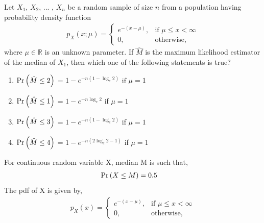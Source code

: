 \documentclass[]{article}
\theoremstyle{remark}
\begin{document}
\providecommand{\qfunc}[1]{\ensuremath{Q\left(#1\right)}}
\providecommand{\gauss}[2]{\mathcal{N}\ensuremath{\left(#1,#2\right)}}
\providecommand{\diff}[2]{\ensuremath{\frac{d{#1}}{d{#2}}}}
\providecommand{\myceil}[1]{\left \lceil #1 \right \rceil }
\newcommand\figref{Fig.~\ref}
\newcommand\tabref{Table~\ref}
\newcommand{\sinc}{\,\text{sinc}\,}
\newcommand{\rect}{\,\text{rect}\,}

\let\vec\mathbf

Let $X_1$, $X_2$, ... , $X_n$ be a random sample of size $n$ from a population having probability density function
\begin{align}
p_X(x; \mu) =
\begin{cases}
e^{-(x-\mu)}, & \text{if } \mu \leq x < \infty \\
0, & \text{otherwise,} 
\end{cases}
\end{align}
where $\mu \in \mathbb{R}$ is an unknown parameter. If $\hat{M}$ is the maximum likelihood estimator of the median of $X_1$, then which one of the following statements is true?
\begin{enumerate}[label=\Alph*)]
  \item $\Pr\left(\hat{M} \leq 2\right)$ = $1 - e^{-n(1-\log_e 2)}$ if $\mu = 1$
  \item $\Pr\left(\hat{M} \leq 1\right)$ = $1 - e^{-n \log_e 2}$ if $\mu = 1$
  \item $\Pr\left(\hat{M} \leq 3\right)$ = $1 - e^{-n(1-\log_e 2)}$ if $\mu = 1$
  \item $\Pr\left(\hat{M} \leq 4\right)$ = $1 - e^{-n(2\log_e 2-1)}$ if $\mu = 1$
\end{enumerate}
\solution
For continuous random variable X, median M is such that,
\begin{align}
\Pr\left(X \leq M\right) &= 0.5
\end{align}
The pdf of X is given by,
\begin{align}
p_X(x) =
\begin{cases}
e^{-(x-\mu)}, & \text{if } \mu \leq x < \infty \\
0, & \text{otherwise,} 
\end{cases}
\label{eq:391}
\end{align}
\end{document}
